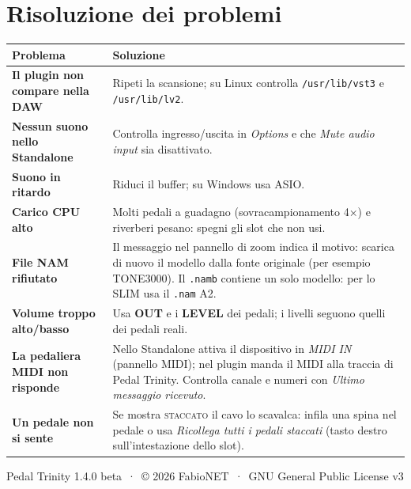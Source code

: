 \documentclass[11pt,a4paper]{article}
\newcommand{\ctl}[1]{\textbf{\textsf{#1}}}
\begin{document}
\clearpage
\section{Risoluzione dei problemi}
\begin{tabularx}{\linewidth}{@{}>{\bfseries}p{5.2cm} X@{}}
\toprule
Problema & Soluzione \\ \midrule
Il plugin non compare nella DAW & Ripeti la scansione; su Linux controlla \texttt{/usr/lib/vst3} e \texttt{/usr/lib/lv2}. \\
Nessun suono nello Standalone & Controlla ingresso/uscita in \emph{Options} e che \emph{Mute audio input} sia disattivato. \\
Suono in ritardo & Riduci il buffer; su Windows usa ASIO. \\
Carico CPU alto & Molti pedali a guadagno (sovracampionamento 4×) e riverberi pesano: spegni gli slot che non usi. \\
File NAM rifiutato & Il messaggio nel pannello di zoom indica il motivo: scarica di nuovo il modello dalla fonte originale (per esempio TONE3000). Il \texttt{.namb} contiene un solo modello: per lo SLIM usa il \texttt{.nam} A2. \\
Volume troppo alto/basso & Usa \ctl{OUT} e i \ctl{LEVEL} dei pedali; i livelli seguono quelli dei pedali reali. \\
La pedaliera MIDI non risponde & Nello Standalone attiva il dispositivo in \emph{MIDI IN} (pannello MIDI); nel plugin manda il MIDI alla traccia di Pedal Trinity. Controlla canale e numeri con \emph{Ultimo messaggio ricevuto}. \\
Un pedale non si sente & Se mostra \textsc{staccato} il cavo lo scavalca: infila una spina nel pedale o usa \emph{Ricollega tutti i pedali staccati} (tasto destro sull'intestazione dello slot). \\ \bottomrule
\end{tabularx}
\vfill
\begin{center}\small\color{steel}Pedal Trinity 1.4.0 beta \,·\, © 2026 FabioNET \,·\, GNU General Public License v3\end{center}
\end{document}
